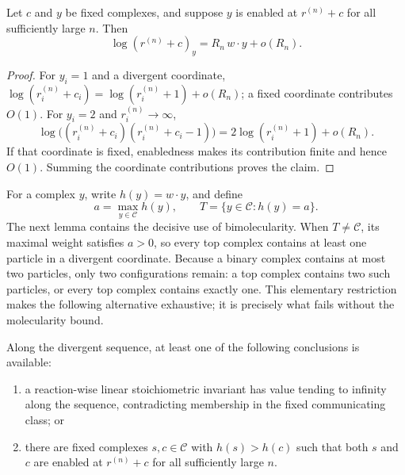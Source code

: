 \begin{lemma}\label{lem:ff-asymptotic}
Let \(c\) and \(y\) be fixed complexes, and suppose \(y\) is enabled at
\(r^{(n)}+c\) for all sufficiently large \(n\).  Then
\begin{equation}\label{eq:ff-asymptotic}
  \log(r^{(n)}+c)_y=R_n\,w\cdot y+o(R_n).
\end{equation}
\end{lemma}

\begin{proof}
For \(y_i=1\) and a divergent coordinate,
\(\log(r_i^{(n)}+c_i)=\log(r_i^{(n)}+1)+o(R_n)\); a fixed coordinate
contributes \(O(1)\).  For \(y_i=2\) and \(r_i^{(n)}\to\infty\),
\[
 \log\bigl((r_i^{(n)}+c_i)(r_i^{(n)}+c_i-1)\bigr)
 =2\log(r_i^{(n)}+1)+o(R_n).
\]
If that coordinate is fixed, enabledness makes its contribution finite and
hence \(O(1)\).  Summing the coordinate contributions proves the claim.
\end{proof}

For a complex \(y\), write \(h(y)=w\cdot y\), and define
\begin{equation}\label{eq:top}
  a=\max_{y\in\mathcal C}h(y),
  \qquad
  T=\{y\in\mathcal C:h(y)=a\}.
\end{equation}
The next lemma contains the decisive use of bimolecularity.
When \(T\ne\mathcal C\), its maximal weight satisfies \(a>0\), so every top
complex contains at least one particle in a divergent coordinate.  Because a
binary complex contains at most two particles, only two configurations remain:
a top complex contains two such particles, or every top complex contains
exactly one.  This elementary restriction makes the following alternative
exhaustive; it is precisely what fails without the molecularity bound.

\begin{lemma}\label{lem:top}
Along the divergent sequence, at least one of the following conclusions is
available:

\begin{enumerate}[label=\textup{(\roman*)},leftmargin=2.5em]
\item a reaction-wise linear stoichiometric invariant has value tending to
      infinity along the sequence, contradicting membership in the fixed
      communicating class; or
\item there are fixed complexes \(s,c\in\mathcal C\) with
      \(h(s)>h(c)\) such that both \(s\) and \(c\) are enabled at
      \(r^{(n)}+c\) for all sufficiently large \(n\).
\end{enumerate}
\end{lemma}

